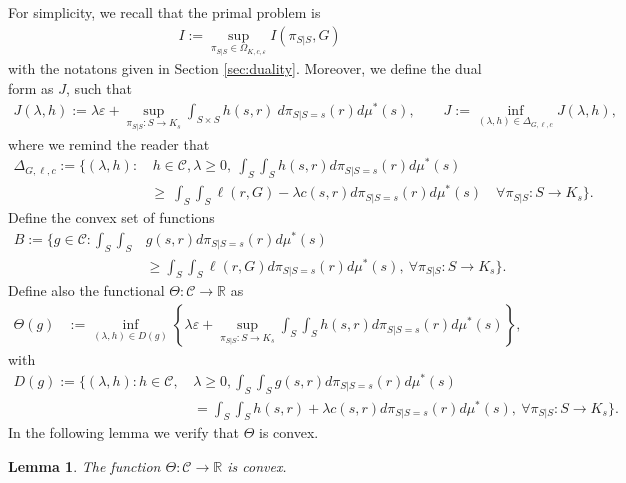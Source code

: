 \documentclass{article}
\newcommand{\R}{\mathbb{R}} %
\newcommand{\C}{\mathcal{C}} %
\newcommand{\Okc}{\Omega_{K, c, \varepsilon}}
\newcommand{\D}{\Delta_{G,\ell, c}}
\newtheorem{lemma}[theorem]{Lemma}
\theoremstyle{definition}
\theoremstyle{remarksty}
\begin{document}
For simplicity, we recall that the primal problem is 
\begin{align*}
    I := \sup_{\pi_{S|S} \in \Okc} I(\pi_{S|S}, G)
\end{align*}
with the notatons given in Section \ref{sec:duality}.
Moreover, we define the dual form as $J$, such that
\begin{align*}
    J(\lambda, h) := \lambda \varepsilon + \sup_{\pi_{S|S} : S \rightarrow K_s} \int_{S \times S} h(s,r)\ d\pi_{S|S=s}(r)d\mu^*(s), 
    \qquad J:= \inf_{(\lambda, h) \in \Delta_{G,\ell,c}} J(\lambda,h),
\end{align*}
where we remind the reader that 
\begin{align*}
    \D := \bigg\{ (\lambda,h): & \, h\in \mathcal{C}, \lambda \geq 0,\ \int_S\int_S h(s,r) d\pi_{S|S=s}(r)d\mu^*(s) \\
    &\geq \  \int_S\int_S \ell(r, G) - \lambda c(s, r) d\pi_{S|S=s}(r)d\mu^*(s)   \quad \forall \pi_{S|S}: S\rightarrow K_s \bigg\}.
\end{align*}
Define the convex set of functions
\begin{align}\label{eq:B}
    B:= \bigg\{ g \in \C: \int_S\int_S &g(s,r)d\pi_{S|S=s}(r)d\mu^*(s) \\
    &\geq \int_S\int_S\ell(r,G) d\pi_{S|S=s}(r) d\mu^*(s), \ \forall \pi_{S|S}: S\rightarrow K_s \bigg\}\nonumber.
\end{align}
Define also the functional $\Theta: \mathcal{C} \to \R$ as
\begin{align*} 
    \Theta (g) &:= \inf_{(\lambda, h) \in D(g)} \left\{ \lambda \varepsilon + \sup_{\pi_{S|S}: S\rightarrow K_s} \int_S \int_S h(s,r) d\pi_{S|S=s}(r) d\mu^*(s) \right\},
\end{align*}
with 
\begin{align*} 
    D(g):= \bigg\{ (\lambda, h):  h\in \mathcal{C}, \, & \lambda \geq 0, \int_S \int_S g(s,r)d\pi_{S|S=s}(r)d\mu^*(s) \\
    &= \int_S \int_S h(s,r) + \lambda c(s,r) d\pi_{S|S=s}(r)d\mu^*(s), \ \forall \pi_{S|S}: S\rightarrow K_s \bigg\}.
\end{align*}
In the following lemma we verify that $\Theta$ is convex.

\begin{lemma}
    The function $\Theta : 
    \mathcal{C} \rightarrow \R$ is convex. 
\end{lemma}
\end{document}
